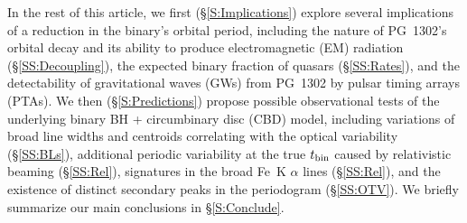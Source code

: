 In the rest of this article, we first (\S\ref{S:Implications})
explore several implications of a reduction in the binary's orbital
period, including the nature of PG~1302's orbital decay and its
ability to produce electromagnetic (EM) radiation
(\S\ref{SS:Decoupling}), the expected binary fraction of quasars
(\S\ref{SS:Rates}), and the detectability of gravitational waves (GWs)
from PG~1302 by pulsar timing arrays (PTAs).  We then
(\S\ref{S:Predictions}) propose possible observational tests of the
underlying binary BH + circumbinary disc (CBD) model, including variations
of broad line widths and centroids correlating with the optical
variability (\S \ref{SS:BLs}), additional periodic variability at the
true $t_{\rm bin}$ caused by relativistic beaming (\S\ref{SS:Rel}),
signatures in the broad Fe~K $\alpha$ lines (\S\ref{SS:Rel}), and the
existence of distinct secondary peaks in the periodogram
(\S\ref{SS:OTV}).  We briefly summarize our main conclusions in
\S\ref{S:Conclude}.


